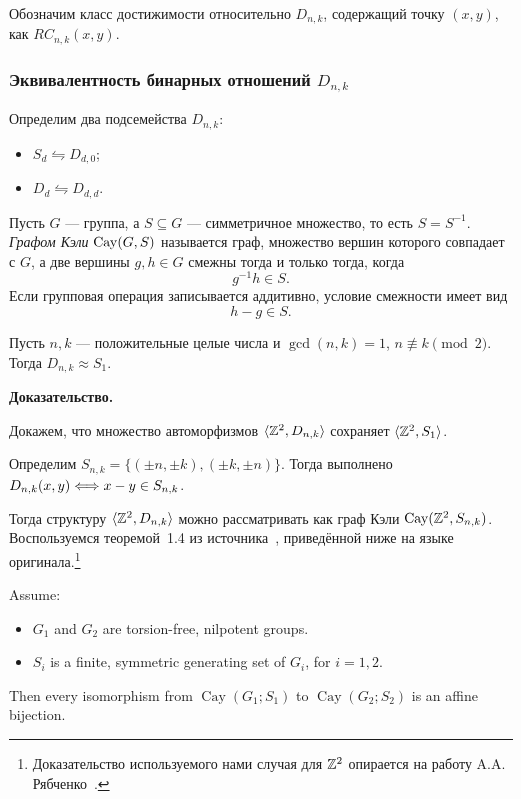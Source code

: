 Обозначим класс достижимости относительно $D_{n,k}$, содержащий точку $(x,y)$, как $RC_{n,k}(x,y)$.

\subsubsection{Эквивалентность бинарных отношений $D_{n,k}$}

Определим два подсемейства $D_{n,k}$:
\begin{itemize}
    \item $S_d \leftrightharpoons D_{d,0}$;
    \item $D_d \leftrightharpoons D_{d,d}$.
\end{itemize}

\begin{definition}
    Пусть $G$ --- группа, а $S\subseteq G$ --- симметричное множество,
    то есть $S=S^{-1}$. \textit{Графом Кэли} $\operatorname{Cay}(G,S)$ называется граф,
    множество вершин которого совпадает с $G$, а две вершины $g,h\in G$
    смежны тогда и только тогда, когда
    $$
        g^{-1}h\in S.
    $$
    Если групповая операция записывается аддитивно, условие смежности имеет вид
    $$
        h-g\in S.
    $$
\end{definition}

\begin{namedLemma}
    \label{lemm:equiv_S1}
    Пусть $n,k$ --- положительные целые числа и $\gcd(n,k) = 1$, $n \not \equiv k \pmod 2$. Тогда $D_{n,k} \approx S_1$.
\end{namedLemma}
\textbf{Доказательство.} 

Докажем, что множество автоморфизмов $\langle\mathbb{Z}^2, D_{n,k}\rangle$ сохраняет $\langle\mathbb{Z}^2, S_1\rangle$.

Определим $S_{n,k} = \{(\pm n,\pm k),(\pm k, \pm n)\}$. Тогда выполнено $D_{n,k}(x,y) \Longleftrightarrow x - y \in S_{n,k}$.

Тогда структуру $\langle\mathbb{Z}^2, D_{n,k}\rangle$ можно рассматривать как граф Кэли $\operatorname{Cay}(\mathbb{Z}^2, S_{n,k})$. Воспользуемся теоремой~1.4 из источника~\cite{Cayley_Graphs_Nilpotent_Groups_Morris_Morris_Verret}, приведённой ниже на языке 
оригинала.\footnote{Доказательство используемого нами случая для $\mathbb{Z}^2$ опирается на работу A.A. Рябченко~\cite{Cayley_Graphs_Free_Abelian_Group_Ryabchenko}.}

\begin{theorem}
    \label{theorem:Cayley_Graphs_Isomorphisms}
    Assume:
    \begin{itemize}
        \item $G_1$ and $G_2$ are torsion-free, nilpotent groups.
        \item $S_i$ is a finite, symmetric generating set of $G_i$, for $i=1,2$.
    \end{itemize}
    Then every isomorphism from $\operatorname{Cay}(G_1;S_1)$ to 
    $\operatorname{Cay}(G_2;S_2)$ is an affine bijection.
\end{theorem}

